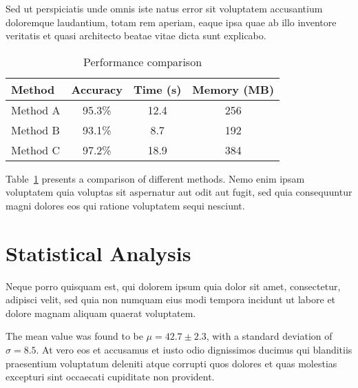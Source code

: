 \documentclass[../main.tex]{subfiles}
\begin{document}
Sed ut perspiciatis unde omnis iste natus error sit voluptatem accusantium doloremque laudantium, totam rem aperiam, eaque ipsa quae ab illo inventore veritatis et quasi architecto beatae vitae dicta sunt explicabo.

\begin{table}[H]
\centering
\caption{Performance comparison}
\label{tab:performance}
\begin{tabular}{lccc}
\hline
\textbf{Method} & \textbf{Accuracy} & \textbf{Time (s)} & \textbf{Memory (MB)} \\
\hline
Method A & 95.3\% & 12.4 & 256 \\
Method B & 93.1\% & 8.7 & 192 \\
Method C & 97.2\% & 18.9 & 384 \\
\hline
\end{tabular}
\end{table}

Table~\ref{tab:performance} presents a comparison of different methods. Nemo enim ipsam voluptatem quia voluptas sit aspernatur aut odit aut fugit, sed quia consequuntur magni dolores eos qui ratione voluptatem sequi nesciunt.

\section{Statistical Analysis}

Neque porro quisquam est, qui dolorem ipsum quia dolor sit amet, consectetur, adipisci velit, sed quia non numquam eius modi tempora incidunt ut labore et dolore magnam aliquam quaerat voluptatem.

The mean value was found to be $\mu = 42.7 \pm 2.3$, with a standard deviation of $\sigma = 8.5$. At vero eos et accusamus et iusto odio dignissimos ducimus qui blanditiis praesentium voluptatum deleniti atque corrupti quos dolores et quas molestias excepturi sint occaecati cupiditate non provident.
\end{document}
